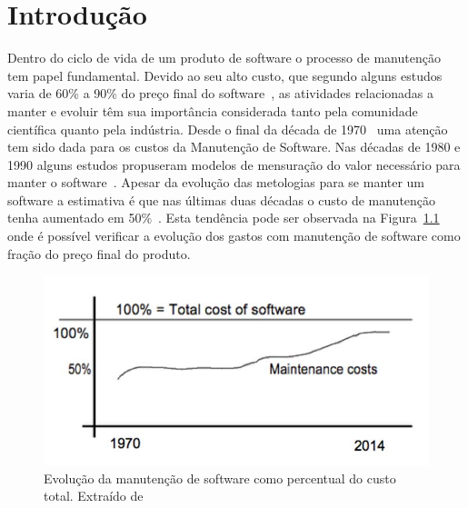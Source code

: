 \chapter{Introdução}
\label{ch:intro}

Dentro do ciclo de vida de um produto de software o processo de manutenção tem
papel fundamental. Devido ao seu alto custo, que segundo alguns estudos varia de
60\% a 90\% do preço final do software~\cite{kaur2015review}, as atividades
relacionadas a manter e evoluir têm sua importância considerada tanto pela
comunidade científica quanto pela indústria. Desde o final da década de
1970~\cite{Zelkowitz:1979:PSE:578504} uma atenção tem sido dada para os custos
da Manutenção de Software. Nas décadas de 1980 e 1990 alguns estudos propuseram
modelos de mensuração do valor necessário para manter o
software~\cite{Herrin:1985:SMC:323287.323383,hirota1994approach}. Apesar da
evolução das metologias para se manter um software a estimativa é que nas
últimas duas décadas o custo de manutenção tenha aumentado em
50\%~\cite{koskinen2010software}. Esta tendência pode ser observada na
Figura~\ref{fig:software-maintence-costs} onde é possível verificar a evolução
dos gastos com manutenção de software como fração do preço final do produto.

\begin{figure}[htpb]
\centering
\includegraphics[width=0.7\linewidth]
				{./chapter-intro/img/software-maintence-costs.png}
\caption{Evolução da manutenção de software como percentual do custo total.
	Extraído de~\cite{engelbertink2010save}}
\label{fig:software-maintence-costs}
\end{figure}

